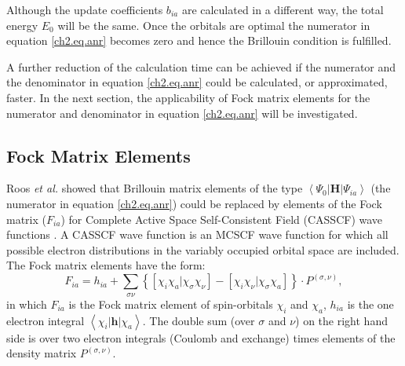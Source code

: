 Although the update coefficients $b_{ia}$ are calculated in a different way, the total energy $E_0$ will be the same. Once the orbitals are optimal the numerator in equation \ref{ch2.eq.anr} becomes zero and hence the Brillouin condition is fulfilled. 

A further reduction of the calculation time can be achieved if the numerator and the denominator in equation \ref{ch2.eq.anr} could be calculated, or approximated, faster. In the next section, the applicability of Fock matrix elements for the numerator and denominator in equation \ref{ch2.eq.anr} will be investigated.

\subsection{\label{ch2.sec.fock}Fock Matrix Elements} 

Roos \textit{et al.} showed that Brillouin matrix elements of the type $\left< \Psi_0 | \mathbf{H} | \Psi_{ia} \right>$ (the numerator in equation \ref{ch2.eq.anr}) could be replaced by elements of the Fock matrix ($F_{ia}$) for Complete Active Space Self-Consistent Field (CASSCF) wave functions \cite{roos1}. A CASSCF wave function is an MCSCF wave function for which all possible electron distributions in the variably occupied orbital space are included. The Fock matrix elements have the form:
\begin{equation}
F_{ia} = h_{ia} + \sum_{\sigma\nu} \left\{ \left[ \chi_i \chi_a | \chi_\sigma \chi_\nu \right] - \left[ \chi_i \chi_\nu | \chi_\sigma \chi_a \right] \right\} \cdot P^{(\sigma,\nu)},
\label{ch2.eq.fock}
\end{equation}
in which $F_{ia}$ is the Fock matrix element of spin-orbitals $\chi_i$ and $\chi_a$, $h_{ia}$ is the one electron integral $\left< \chi_i | \mathbf{h}| \chi_a \right>$. The double sum (over $\sigma$ and $\nu$) on the right hand side is over two electron integrals (Coulomb and exchange) times elements of the density matrix $P^{(\sigma,\nu)}$. 

